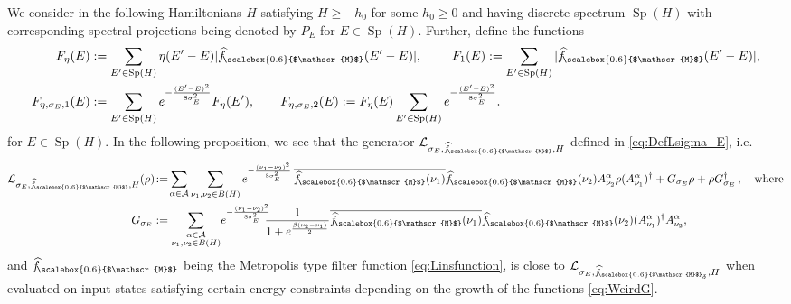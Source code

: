 \documentclass[11pt]{amsart}
\newcommand{\nn}{\nonumber}
\newcommand{\1}{\mathbbm{1}}
\newcommand{\cL}{\mathcal{L}}
\newcommand{\spec}{\operatorname{Sp}}
\newcommand{\cA}{\mathcal{A}}
\newcommand{\hatfM}{\widehat{f}_{\!\scalebox{0.6}{$\mathscr{M}$}}
}
\newcommand{\hatfMdelta}{\widehat{f}_{\!\scalebox{0.6}{$\mathscr{M}$}_\delta}}
\theoremstyle{plain}
\theoremstyle{definition}
\theoremstyle{remark}
\numberwithin{equation}{section}
\begin{document}
We consider in the following Hamiltonians  $H$ satisfying $H\ge -h_0$ for some $h_0\ge 0$ and having discrete spectrum $\spec(H)$ with corresponding spectral projections being denoted by $P_{E}$ for $E\in\spec(H)$. Further, define the functions
\begin{align}
\label{eq:WeirdG}
   \nn F_\eta(E) &:= \sum_{E'\in\spec(H)}  \eta(E'-E)|\hatfM(E'-E)|,\qquad\ F_1(E) := \sum_{E'\in\spec(H)} |\hatfM(E'-E)|,\\
   F_{\eta,\sigma_E,1}(E) &:=\sum_{E'\in \spec(H)} e^{-\frac{(E'-E)^2}{8\sigma^2_E}} F_{\eta}(E'),\qquad F_{\eta,\sigma_E,2}(E) := F_{\eta}(E)\sum_{E'\in \spec(H)} e^{-\frac{(E'-E)^2}{8\sigma^2_E}}.
\end{align}
for $E\in\spec(H).$ In the following proposition, we see that the generator $\cL_{\sigma_E,\hatfM,H}$ defined in \eqref{eq:DefLsigma_E}, i.e.
\begin{align*}
\mathcal{L}_{\sigma_E,\hatfM,H}(\rho)\!&:= \!\sum_{\alpha\in\cA}\sum_{\nu_1,\nu_2\in B(H)}e^{-\frac{(\nu_1-\nu_2)^2}{8\sigma_E^2}}\,\overline{\hatfM(\nu_1)}\hatfM(\nu_2)A^\alpha_{\nu_2}\rho (A^\alpha_{\nu_1})^\dagger+G_{\sigma_E}\rho+\rho G_{\sigma_E}^\dagger\,,\quad\text{where}\\
G_{\sigma_E}&:= \sum_{\substack{\alpha\in\mathcal{A}\\ \nu_1,\nu_2\in B(H)}}\!e^{-\frac{(\nu_1-\nu_2)^2}{8\sigma_E^2}}\!\!\! \frac{1}{1+e^{\frac{\beta(\nu_2-\nu_1)}{2}}}\overline{\hatfM(\nu_1)}\hatfM(\nu_2)(A^\alpha_{\nu_1})^\dagger A^\alpha_{\nu_2},
\end{align*}
and $\hatfM$ being the Metropolis type filter function \eqref{eq:Linsfunction}, is close to $\cL_{\sigma_E,\hatfMdelta,H}$ when evaluated on input states satisfying certain energy constraints depending on the growth of the functions \eqref{eq:WeirdG}.
\end{document}
